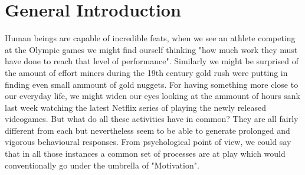\section{General Introduction}
Human beings are capable of incredible feats, when we see an athlete competing at the Olympic games we might find ourself thinking "how much work they must have done to reach that level of performance". Similarly we might be surprised of the amount of effort miners during the 19th century gold rush were putting in finding even small ammount of gold nuggets. For having something more close to our everyday life, we might widen our eyes looking at the ammount of hours sank last week watching the latest Netflix series of playing the newly released videogames. But what do all these activities have in common? They are all fairly different from each but nevertheless seem to be able to generate prolonged and vigorous behavioural responses. From psychological point of view, we could say that in all those instances a common set of processes are at play which would conventionally go under the umbrella of "Motivation".


